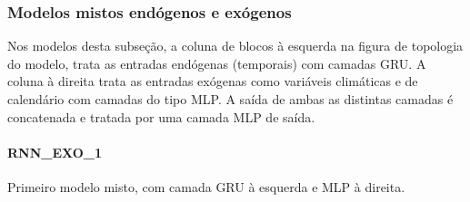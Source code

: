 \documentclass[	12pt, Times, openright, twoside, a4paper, english, brazil]{abntex2}
\begin{document}
            
    	    \subsubsection{Modelos mistos endógenos e exógenos}
    	    Nos modelos desta subseção, a coluna de blocos à esquerda na figura de topologia do modelo, trata as entradas endógenas (temporais) com camadas GRU. A coluna à direita trata as entradas exógenas como variáveis climáticas e de calendário com camadas do tipo MLP.
    	    A saída de ambas as distintas camadas é concatenada e tratada por uma camada MLP de saída.
              \paragraph{RNN\_EXO\_1} Primeiro modelo misto, com camada GRU à esquerda e MLP à direita.
                \begin{figure}[H]
                \end{figure}
\end{document}
